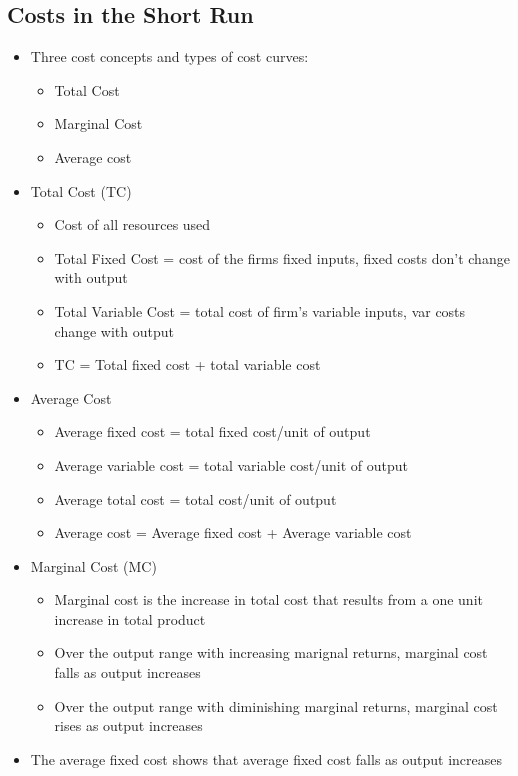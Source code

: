 \documentclass[11pt]{article}
\begin{document}
\subsection{Costs in the Short Run}
\label{sec:org7f42b32}
\begin{itemize}
\item Three cost concepts and types of cost curves:
\begin{itemize}
\item Total Cost
\item Marginal Cost
\item Average cost
\end{itemize}
\end{itemize}
\begin{itemize}
\item Total Cost (TC)
\begin{itemize}
\item Cost of all resources used
\item Total Fixed Cost = cost of the firms fixed inputs, fixed costs don't change with output
\item Total Variable Cost = total cost of firm's variable inputs, var costs change with output
\item TC = Total fixed cost + total variable cost
\end{itemize}
\item Average Cost
\begin{itemize}
\item Average fixed cost = total fixed cost/unit of output
\item Average variable cost = total variable cost/unit of output
\item Average total cost = total cost/unit of output
\item Average cost = Average fixed cost + Average variable cost
\end{itemize}
\item Marginal Cost (MC)
\begin{itemize}
\item Marginal cost is the increase in total cost that results from a one unit increase in total product
\item Over the output range with increasing marignal returns, marginal cost falls as output increases
\item Over the output range with diminishing marginal returns, marginal cost rises as output increases
\end{itemize}
\item The average fixed cost shows that average fixed cost falls as output increases

\end{itemize}
\end{document}
